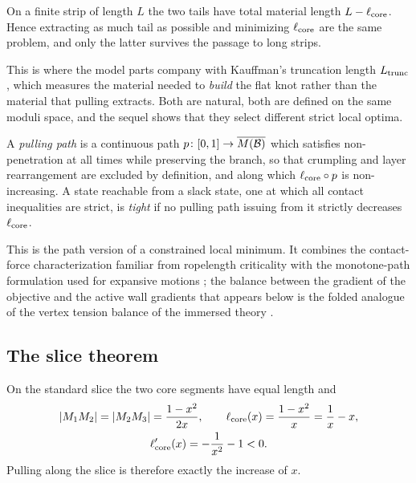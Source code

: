 \begin{proposition}\label{prop:pulling}
On a finite strip of length $L$ the two tails have total material length $L-\ell_{\mathrm{core}}$. Hence extracting as much tail as possible and minimizing $\ell_{\mathrm{core}}$ are the same problem, and only the latter survives the passage to long strips.
\end{proposition}

This is where the model parts company with Kauffman's truncation length $L_{\mathrm{trunc}}$ \cite{kauffman2004}, which measures the material needed to \emph{build} the flat knot rather than the material that pulling extracts. Both are natural, both are defined on the same moduli space, and the sequel shows that they select different strict local optima.

\begin{definition}\label{def:pull}
A \emph{pulling path} is a continuous path $p\colon[0,1]\to\overline{M(\mathcal{B})}$ which satisfies non-penetration at all times while preserving the branch, so that crumpling and layer rearrangement are excluded by definition, and along which $\ell_{\mathrm{core}}\circ p$ is non-increasing. A state reachable from a slack state, one at which all contact inequalities are strict, is \emph{tight} if no pulling path issuing from it strictly decreases $\ell_{\mathrm{core}}$.
\end{definition}

This is the path version of a constrained local minimum. It combines the contact-force characterization familiar from ropelength criticality \cite{cks2002,svdm2004} with the monotone-path formulation used for expansive motions \cite{cdr2003}; the balance between the gradient of the objective and the active wall gradients that appears below is the folded analogue of the vertex tension balance of the immersed theory \cite{immersed2020,ayala2025}.

\subsection{The slice theorem}

\begin{lemma}\label{lem:sliceform}
On the standard slice the two core segments have equal length and
\[
\begin{gathered}
  |M_1M_2|=|M_2M_3|=\frac{1-x^2}{2x},\qquad
  \ell_{\mathrm{core}}(x)=\frac{1-x^2}{x}=\frac1x-x,\\
  \ell_{\mathrm{core}}'(x)=-\frac1{x^2}-1<0 .
\end{gathered}
\]
Pulling along the slice is therefore exactly the increase of $x$.
\end{lemma}

